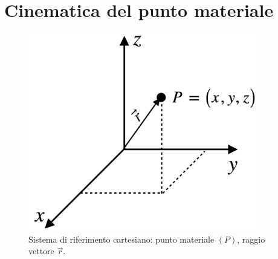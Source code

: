 \chapter{Cinematica del punto materiale} %
\begin{figure}[htbp]
    \begin{center}
        \includegraphics[width=10cm]{images/assi.png} 
        \caption{Sistema di riferimento cartesiano: punto materiale $(P)$,
        raggio vettore $\vec r$.}
    \end{center}
\end{figure}









